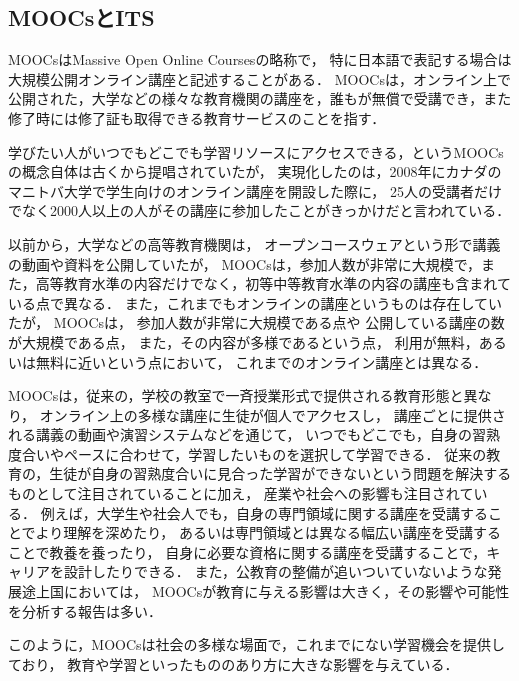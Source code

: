 \subsection{MOOCsとITS}
MOOCsはMassive Open Online Courses\cite{mcauley2010mooc, pappano2012year,siemens2013massive}の略称で，
特に日本語で表記する場合は大規模公開オンライン講座と記述することがある．
MOOCsは，オンライン上で公開された，大学などの様々な教育機関の講座を，誰もが無償で受講でき，また修了時には修了証も取得できる教育サービスのことを指す．

学びたい人がいつでもどこでも学習リソースにアクセスできる，というMOOCsの概念自体は古くから提唱されていたが，
実現化したのは，2008年にカナダのマニトバ大学で学生向けのオンライン講座を開設した際に，
25人の受講者だけでなく2000人以上の人がその講座に参加したことがきっかけだと言われている\cite{yuan2013moocs}．

以前から，大学などの高等教育機関は，
オープンコースウェア\cite{abelson2008creation}という形で講義の動画や資料を公開していたが，
MOOCsは，参加人数が非常に大規模で，また，高等教育水準の内容だけでなく，初等中等教育水準の内容の講座も含まれている点で異なる．
また，これまでもオンラインの講座というものは存在していたが，
MOOCsは，
参加人数が非常に大規模である点や
公開している講座の数が大規模である点，
また，その内容が多様であるという点，
利用が無料，あるいは無料に近いという点において，
これまでのオンライン講座とは異なる．


MOOCsは，従来の，学校の教室で一斉授業形式で提供される教育形態と異なり，
オンライン上の多様な講座に生徒が個人でアクセスし，
講座ごとに提供される講義の動画や演習システムなどを通じて，
いつでもどこでも，自身の習熟度合いやペースに合わせて，学習したいものを選択して学習できる．
従来の教育の，生徒が自身の習熟度合いに見合った学習ができないという問題を解決するものとして注目されていることに加え，
産業や社会への影響も注目されている．
例えば，大学生や社会人でも，自身の専門領域に関する講座を受講することでより理解を深めたり，
あるいは専門領域とは異なる幅広い講座を受講することで教養を養ったり，
自身に必要な資格に関する講座を受講することで，キャリアを設計したりできる．
また，公教育の整備が追いついていないような発展途上国においては，
MOOCsが教育に与える影響は大きく，その影響や可能性を分析する報告は多い\cite{trucano2013more,liyanagunawardena2013impact}．

このように，MOOCsは社会の多様な場面で，これまでにない学習機会を提供しており，
教育や学習といったもののあり方に大きな影響を与えている．


